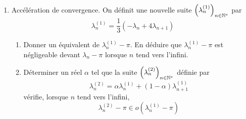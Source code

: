 \begin{enumerate}
 \item Accélération de convergence.\newline
On définit une nouvelle suite $\left( \lambda_n^{(1)}\right) _{n\in \mathbb{N}^*}$ par
\begin{displaymath}
 \lambda_n^{(1)} = \frac{1}{3}\left( -\lambda_n + 4\lambda_{n+1}\right) 
\end{displaymath}
\begin{enumerate} 
 \item Donner un équivalent de $\lambda_n^{(1)} - \pi$. En déduire que $\lambda_n^{(1)} - \pi$ est négligeable devant $\lambda_n - \pi$ lorsque $n$ tend vers l'infini. 
 \item Déterminer un réel $\alpha$ tel que la suite $\left( \lambda_n^{(2)}\right) _{n\in \mathbb{N}^*}$ définie par
\begin{displaymath}
 \lambda_n^{(2)} = \alpha \lambda_n^{(1)} + (1-\alpha)\lambda_{n+1}^{(1)}
\end{displaymath}
vérifie, lorsque $n$ tend vers l'infini,
\begin{displaymath}
 \lambda_n^{(2)} - \pi \in o(\lambda_n^{(1)} - \pi)
\end{displaymath}

\end{enumerate}

\end{enumerate}
